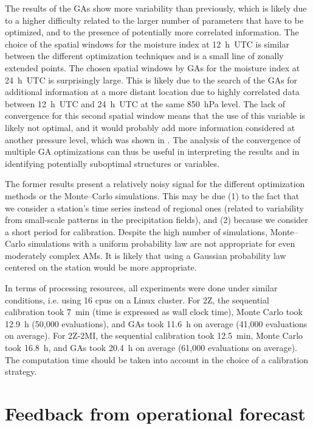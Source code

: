 \documentclass[gmdd]{copernicus}
\begin{document}
The results of the GAs show more variability than previously, which is likely due to a higher difficulty related to the larger number of parameters that have to be optimized, and to the presence of potentially more correlated information. The choice of the spatial windows for the moisture index at 12~h~UTC is similar between the different optimization techniques and is a small line of zonally extended points. The chosen spatial windows by GAs for the moisture index at 24~h~UTC is surprisingly large. This is likely due to the search of the GAs for additional information at a more distant location due to highly correlated data between 12~h~UTC and 24~h~UTC at the same 850~hPa level. The lack of convergence for this second spatial window means that the use of this variable is likely not optimal, and it would probably add more information considered at another pressure level, which was shown in \citet{Horton2018a}. The analysis of the convergence of multiple GA optimizations can thus be useful in interpreting the results and in identifying potentially suboptimal structures or variables.

The former results present a relatively noisy signal for the different optimization methods or the Monte--Carlo simulations. This may be due (1) to the fact that we consider a station’s time series instead of regional ones (related to variability from small-scale patterns in the precipitation fields), and (2) because we consider a short period for calibration. Despite the high number of simulations, Monte--Carlo simulations with a uniform probability law are not appropriate for even moderately complex AMs. It is likely that using a Gaussian probability law centered on the station would be more appropriate.

In terms of processing resources, all experiments were done under similar conditions, i.e. using 16 cpus on a Linux cluster. For 2Z, the sequential calibration took 7~min (time is expressed as wall clock time), Monte Carlo took 12.9~h (50,000 evaluations), and GAs took 11.6~h on average (41,000 evaluations on average). For 2Z-2MI, the sequential calibration took 12.5~min, Monte Carlo took 16.8~h, and GAs took 20.4~h on average (61,000 evaluations on average). The computation time should be taken into account in the choice of a calibration strategy.


\section{Feedback from operational forecast}
\label{sec:operational}
\end{document}
